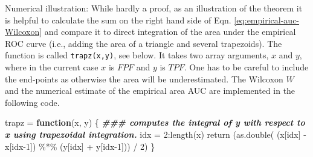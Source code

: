 \documentclass[
]{book}
\newenvironment{Shaded}{\begin{snugshade}}{\end{snugshade}}
\newcommand{\ControlFlowTok}[1]{\textcolor[rgb]{0.13,0.29,0.53}{\textbf{#1}}}
\newcommand{\DecValTok}[1]{\textcolor[rgb]{0.00,0.00,0.81}{#1}}
\newcommand{\DocumentationTok}[1]{\textcolor[rgb]{0.56,0.35,0.01}{\textbf{\textit{#1}}}}
\newcommand{\FunctionTok}[1]{\textcolor[rgb]{0.00,0.00,0.00}{#1}}
\newcommand{\NormalTok}[1]{#1}
\newcommand{\OtherTok}[1]{\textcolor[rgb]{0.56,0.35,0.01}{#1}}
\newcommand{\SpecialCharTok}[1]{\textcolor[rgb]{0.00,0.00,0.00}{#1}}
\begin{document}
Numerical illustration: While hardly a proof, as an illustration of the theorem it is helpful to calculate the sum on the right hand side of Eqn. \eqref{eq:empirical-auc-Wilcoxon} and compare it to direct integration of the area under the empirical ROC curve (i.e., adding the area of a triangle and several trapezoids). The function is called \texttt{trapz(x,y)}, see below. It takes two array arguments, \(x\) and \(y\), where in the current case \(x\) is \(FPF\) and \(y\) is \(TPF\). One has to be careful to include the end-points as otherwise the area will be underestimated. The Wilcoxon \(W\) and the numerical estimate of the empirical area AUC are implemented in the following code.

\begin{Shaded}
\begin{Highlighting}[]
\NormalTok{trapz }\OtherTok{=} \ControlFlowTok{function}\NormalTok{(x, y)}
\NormalTok{\{ }\DocumentationTok{\#\#\# computes the integral of y with respect to x using trapezoidal integration.}
\NormalTok{  idx }\OtherTok{=} \DecValTok{2}\SpecialCharTok{:}\FunctionTok{length}\NormalTok{(x)}
  \FunctionTok{return}\NormalTok{ (}\FunctionTok{as.double}\NormalTok{( (x[idx] }\SpecialCharTok{{-}}\NormalTok{ x[idx}\DecValTok{{-}1}\NormalTok{]) }\SpecialCharTok{\%*\%}\NormalTok{ (y[idx] }\SpecialCharTok{+}\NormalTok{ y[idx}\DecValTok{{-}1}\NormalTok{])) }\SpecialCharTok{/} \DecValTok{2}\NormalTok{)}
\NormalTok{\}}
\end{Highlighting}
\end{Shaded}
\end{document}
